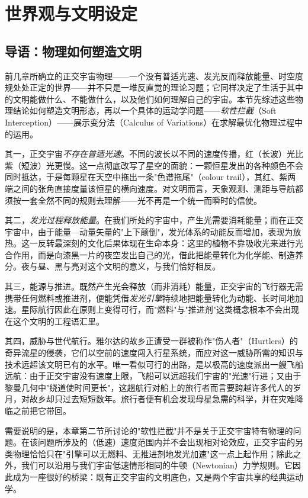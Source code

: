 \chapter{世界观与文明设定}

\section{导语：物理如何塑造文明}

前几章所确立的正交宇宙物理——一个没有普适光速、发光反而释放能量、时空度规处处正定的世界——并不只是一堆反直觉的理论习题；它同样决定了生活于其中的文明能做什么、不能做什么，以及他们如何理解自己的宇宙。本节先综述这些物理结论如何塑造文明形态，再以一个具体的运动学问题——\emph{软性拦截}（Soft Interception）——展示变分法（Calculus of Variations）在求解最优化物理过程中的运用。

其一，正交宇宙\emph{不存在普适光速}。不同的波长以不同的速度传播，红（长波）光比紫（短波）光更慢。这一点彻底改写了星空的面貌：一颗恒星发出的各种颜色不会同时抵达，于是每颗星在天空中拖出一条"色谱拖尾"（colour trail），其红、紫两端之间的张角直接度量该恒星的横向速度。对文明而言，天象观测、测距与导航都须按一套全然不同的规则去理解——光不再是一个统一而瞬时的信使。

其二，\emph{发光过程释放能量}。在我们所处的宇宙中，产生光需要消耗能量；而在正交宇宙中，由于能量—动量矢量的"上下颠倒"，发光体系的动能反而增加，表现为放热。这一反转最深刻的文化后果体现在生命本身：这里的植物不靠吸收光来进行光合作用，而是向漆黑一片的夜空发出自己的光，借此把能量转化为化学能、制造养分。夜与昼、黑与亮对这个文明的意义，与我们恰好相反。

其三，能源与推进。既然产生光会释放（而非消耗）能量，正交宇宙的飞行器无需携带任何燃料或推进剂，便能凭借\emph{发光引擎}持续地把能量转化为动能、长时间地加速。星际航行因此在原则上变得可行，而"燃料"与"推进剂"这类概念根本不会出现在这个文明的工程语汇里。

其四，威胁与世代航行。雅尔达的故乡正遭受一群被称作"伤人者"（Hurtlers）的奇异流星的侵袭，它们以空前的速度闯入行星系统，而应对这一威胁所需的知识与技术远超该文明已有的水平。唯一看似可行的出路，是以极高的速度派出一艘飞船远航：由于正交宇宙没有速度上限，飞船可以远超我们宇宙的"光速"行进；又由于黎曼几何中"绕道使时间更长"，这趟航行对船上的旅行者而言要跨越许多代人的岁月，对故乡却只过去短短数年。旅行者便有机会发现母星急需的科学，并在灾难降临之前把它带回。

需要说明的是，本章第二节所讨论的"软性拦截"并不是关于正交宇宙特有物理的问题。在该问题所涉及的（低速）速度范围内并不会出现相对论效应，正交宇宙的另类物理恰恰只在"引擎可以无燃料、无推进剂地发光加速"这一点上起作用；除此之外，我们可以沿用与我们宇宙低速情形相同的牛顿（Newtonian）力学规则。它因此成为一座很好的桥梁：既有正交宇宙的文明底色，又是两个宇宙共享的经典运动学。

